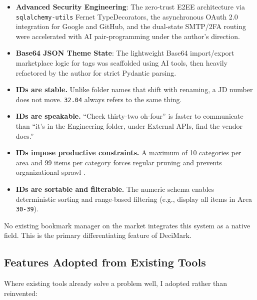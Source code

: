 \documentclass[11pt,a4paper]{book}
\begin{document}
\begin{itemize}
  \item \textbf{Advanced Security Engineering}: The zero-trust E2EE architecture via \texttt{sqlalchemy-utils} Fernet TypeDecorators, the asynchronous OAuth 2.0 integration for Google and GitHub, and the dual-state SMTP/2FA routing were accelerated with AI pair-programming under the author's direction.
  \item \textbf{Base64 JSON Theme State}: The lightweight Base64 import/export marketplace logic for tags was scaffolded using AI tools, then heavily refactored by the author for strict Pydantic parsing.

  \item \textbf{IDs are stable.} Unlike folder names that shift with renaming, a JD number does not move. \texttt{32.04} always refers to the same thing.
  \item \textbf{IDs are speakable.} ``Check thirty-two oh-four'' is faster to communicate than ``it's in the Engineering folder, under External APIs, find the vendor docs.''
  \item \textbf{IDs impose productive constraints.} A maximum of 10 categories per area and 99 items per category forces regular pruning and prevents organizational sprawl \citep{johnnydecimal2021}.
  \item \textbf{IDs are sortable and filterable.} The numeric schema enables deterministic sorting and range-based filtering (e.g., display all items in Area \texttt{30-39}).
\end{itemize}

No existing bookmark manager on the market integrates this system as a native field. This is the primary differentiating feature of DeciMark.

\subsection{Features Adopted from Existing Tools}

Where existing tools already solve a problem well, I adopted rather than reinvented:
\end{document}
